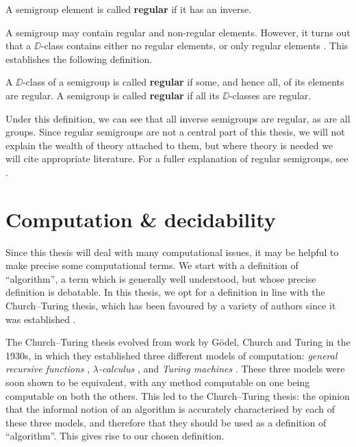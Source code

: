 \begin{definition}
  \label{def:regular-element}
  A semigroup element is called \textbf{regular} if it has an inverse.
\end{definition}

A semigroup may contain regular and non-regular elements.  However, it turns out
that a $\DD$-class contains either no regular elements, or only regular elements
\cite[Proposition 2.3.1]{howie}.  This establishes the following definition.

\begin{definition}
  \label{def:regular-semigroup}
  A $\DD$-class of a semigroup is called \textbf{regular} if some, and hence
  all, of its elements are regular.  A semigroup is called \textbf{regular} if
  all its $\DD$-classes are regular.
\end{definition}

Under this definition, we can see that all inverse semigroups are regular, as
are all groups.  Since regular semigroups are not a central part of this thesis,
we will not explain the wealth of theory attached to them, but where theory is
needed we will cite appropriate literature.  For a fuller explanation of regular
semigroups, see \cite[\S2.4]{howie}.

\section{Computation \& decidability}
\label{sec:computation-decidability}

Since this thesis will deal with many computational issues, it may be helpful to
make precise some computational terms.  We start with a definition of
``algorithm'', a term which is generally well understood, but whose precise
definition is debatable.  In this thesis, we opt for a definition in line with
the Church--Turing thesis, which has been favoured by a variety of authors since
it was established \cite{gurevich_2000, minsky_1967}.

The Church--Turing thesis evolved from work by G\"{o}del, Church and Turing in
the 1930s, in which they established three different models of computation:
\textit{general recursive functions} \cite{godel}, \textit{$\lambda$-calculus}
\cite{church}, and \textit{Turing machines} \cite{turing}.  These three models
were soon shown to be equivalent, with any method computable on one being
computable on both the others.  This led to the Church--Turing thesis: the
opinion that the informal notion of an algorithm is accurately characterised by
each of these three models, and therefore that they should be used as a
definition of ``algorithm''.  This gives rise to our chosen definition.

